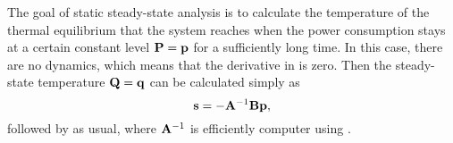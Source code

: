 The goal of static steady-state analysis is to calculate the temperature of the
thermal equilibrium that the system reaches when the power consumption stays at
a certain constant level $\mathbf{P} = \mathbf{p}$ for a sufficiently long time. In this case,
there are no dynamics, which means that the derivative in
 is zero. Then the steady-state temperature $\mathbf{Q}
= \mathbf{q}$ can be calculated simply as
\[
  \mathbf{s} = -\mathbf{A}^{-1} \mathbf{B} \mathbf{p},
\]
followed by  as usual, where $\mathbf{A}^{-1}$ is
efficiently computer using .
